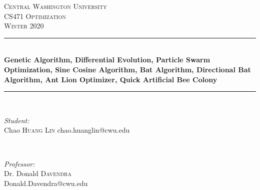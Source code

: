 \documentclass[12pt]{article}
\begin{document}
    
    \begin{titlepage}
        
        \newcommand{\HRule}{\rule{\linewidth}{0.5mm}} %
        
        \center %
        
        
        \textsc{\LARGE Central Washington University}\\[1.5cm] %
        \textsc{\Large CS471 Optimization}\\[0.5cm] %
        \textsc{\large Winter 2020}\\[0.5cm] %
        
        
        \HRule \\[0.4cm]
        { \huge \bfseries Genetic Algorithm, Differential Evolution, Particle Swarm Optimization, Sine Cosine Algorithm, Bat Algorithm, Directional Bat Algorithm, Ant Lion Optimizer, Quick Artificial Bee Colony}\\[0.2cm] %
        \HRule \\[1cm]
        
        
        \begin{minipage}{0.5\textwidth}
            \begin{flushleft} \large
                \emph{Student:}\\
                Chao \textsc{Huang Lin} chao.huanglin@cwu.edu
                
                
            \end{flushleft}
        \end{minipage}
        ~
        \begin{minipage}{0.45\textwidth}
            \begin{flushright} \large
                \emph{Professor:} \\
                Dr. Donald \textsc{Davendra}\\ %
                Donald.Davendra@cwu.edu
            \end{flushright}
        \end{minipage}\\[0.5cm]
        

\end{titlepage}
\end{document}

